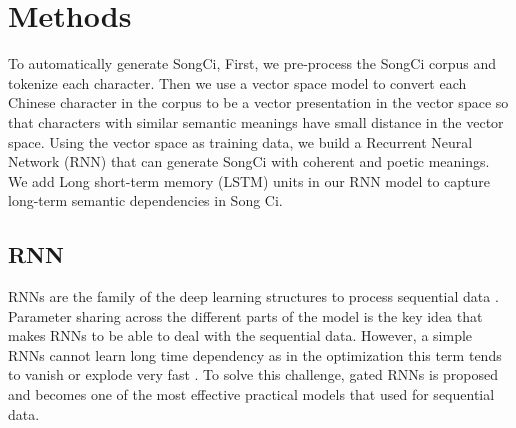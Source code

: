 \section{Methods}   
To automatically generate SongCi,  
First, we pre-process the SongCi corpus and tokenize each character.
%
Then we use a vector space model to convert each Chinese character in the corpus to be a vector presentation in the vector space so that characters with similar semantic meanings have small distance in the vector space.
%
Using the vector space as training data, we build a Recurrent Neural Network (RNN) that can generate SongCi with coherent and poetic meanings.
%
We add Long short-term memory (LSTM) units in our RNN model to capture long-term semantic dependencies in Song Ci.

\subsection{RNN}
%
%
RNNs are the family of the deep learning structures to process sequential data  \cite{rumelhart1986}. 
%
Parameter sharing across the different parts of the model is the key idea that makes RNNs to be able to deal with the sequential data. 
%
However, a simple RNNs cannot learn long time dependency as in the optimization this term tends to vanish or explode very fast \cite{goodfellow2016deeplearning}. 
%
To solve this challenge, gated RNNs is proposed and becomes one of the most effective practical models that used for sequential data.


